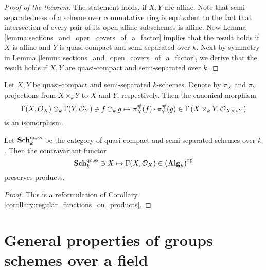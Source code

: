 \begin{proof}[Proof of the theorem]
The statement holds, if $X,Y$ are affine. Note that semi-separatedness of a scheme over commutative ring is equivalent to the fact that intersection of every pair of its open affine subschemes is affine. Now Lemma \ref{lemma:sections_and_open_covers_of_a_factor} implies that the result holds if $X$ is affine and $Y$ is quasi-compact and semi-separated over $k$. Next by symmetry in Lemma \ref{lemma:sections_and_open_covers_of_a_factor}, we derive that the result holds if $X,Y$ are quasi-compact and semi-separated over $k$.
\end{proof}

\begin{corollary}\label{corollary:regular_functions_on_products}
Let $X,Y$ be quasi-compact and semi-separated $k$-schemes. Denote by $\pi_X$ and $\pi_Y$ projections from $X\times_kY$ to $X$ and $Y$, respectively. Then the canonical morphism
$$\Gamma(X,{\mathcal O}_X)\otimes_k\Gamma(Y,{\mathcal O}_Y)\ni f\otimes_k g\mapsto \pi_X^{\#}(f)\cdot \pi_Y^{\#}(g)\in \Gamma\left(X\times_kY,{\mathcal O}_{X\times_kY}\right)$$
is an isomorphism.
\end{corollary}

\begin{corollary}\label{corollary:functorial_reformulation_of_regular_functions_on_products}
Let $\mathbf{Sch}_k^{\mathrm{qc,ss}}$ be the category of quasi-compact and semi-separated schemes over $k$. Then the contravariant functor
$$\mathbf{Sch}_k^{\mathrm{qc},\mathrm{ss}}\ni X \mapsto \Gamma(X,{\mathcal O}_X)\in \left(\mathbf{Alg}_k\right)^{\mathrm{op}}$$
preserves products.
\end{corollary}
\begin{proof}
This is a reformulation of Corollary \ref{corollary:regular_functions_on_products}.
\end{proof}

\section{General properties of groups schemes over a field}

